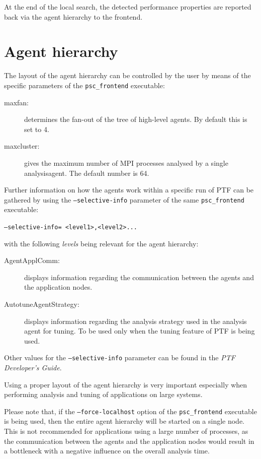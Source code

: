 \documentclass[11pt,oneside,a4paper]{book}
\newenvironment{code}%
{
\addtolength{\leftskip}{0.5cm}}%
{

}
\begin{document}
At the end of the local search, the detected performance properties are reported back via the agent hierarchy to the frontend.

\section{Agent hierarchy}
The layout of the agent hierarchy can be controlled by the user by means of the specific parameters of the \texttt{psc\_frontend} executable:

\begin{description}
	\item[maxfan:] determines the fan-out of the tree of high-level agents. By default this is set to 4.
	\item[maxcluster:] gives the maximum number of MPI processes analysed by a single analysisagent. The default number is 64.
\end{description}

Further information on how the agents work within a specific run of PTF can be gathered by using the \texttt{--selective-info} parameter of the same \texttt{psc\_frontend} executable:

\begin{code}
 \texttt{--selective-info= \textless level1\textgreater,\textless level2\textgreater... }
\end{code}

with the following \textit{levels} being relevant for the agent hierarchy:
\begin{description}
	\item[AgentApplComm:] displays information regarding the communication between the agents and the application nodes.
	\item[AutotuneAgentStrategy:] displays information regarding the analysis strategy used in the analysis agent for tuning. To be used only when the tuning feature of PTF is being used.	
\end{description}

Other values for the \texttt{--selective-info} parameter can be found in the \textit{PTF Developer's Guide}.

Using a proper layout of the agent hierarchy is very important especially when performing analysis and tuning of applications on large systems.

Please note that, if the \texttt{--force-localhost} option of the \texttt{psc\_frontend} executable is being used, then the entire agent hierarchy will be started on a single node. This is not recommended for applications using a large number of processes, as the communication between the agents and the application nodes would result in a bottleneck with a negative influence on the overall analysis time.
\end{document}
